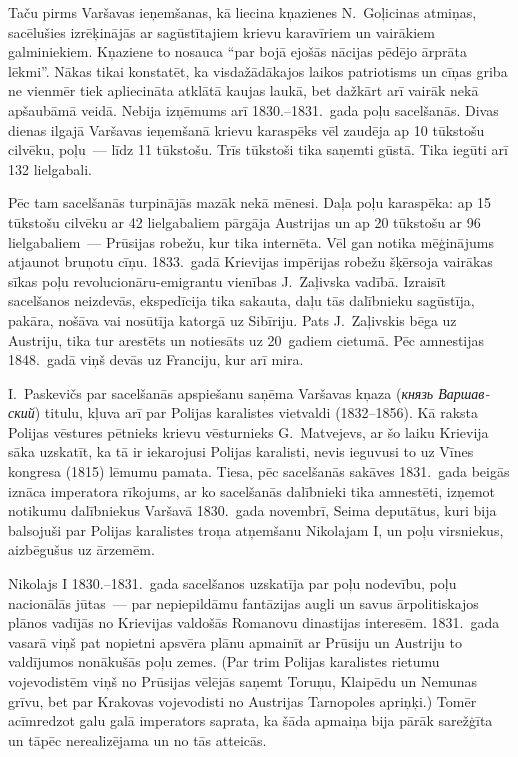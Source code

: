 \documentclass[twoside,a5paper,12pt,fleqn,openany]{extbook}
\newcommand{\rutxti}[1]{\textit{\textrussian{#1}}}
\begin{document}
\vspace{1.5em}



Taču pirms Varšavas ieņemšanas, kā liecina kņazienes N.~Goļicinas atmiņas, sacēlušies izrēķinājās ar sagūstītajiem krievu karavīriem un vairākiem galminiekiem. Kņaziene to nosauca ``par bojā ejošās nācijas pēdējo ārprāta lēkmi''. Nākas tikai konstatēt, ka visdažādākajos laikos patriotisms un cīņas griba ne vienmēr tiek apliecināta atklātā kaujas laukā, bet dažkārt arī vairāk nekā apšaubāmā veidā. Nebija izņēmums arī 1830.--1831.~gada poļu sacelšanās. Divas dienas ilgajā Varšavas ieņemšanā krievu karaspēks vēl zaudēja ap 10 tūkstošu cilvēku, poļu~--- līdz 11 tūkstošu. Trīs tūkstoši tika saņemti gūstā. Tika iegūti arī 132 lielgabali.

Pēc tam sacelšanās turpinājās mazāk nekā mēnesi. Daļa poļu karaspēka: ap 15 tūkstošu cilvēku ar 42 lielgabaliem pārgāja Austrijas un ap 20 tūkstošu ar 96 lielgabaliem~--- Prūsijas robežu, kur tika internēta. Vēl gan notika mēģinājums atjaunot bruņotu cīņu. 1833.~gadā Krievijas impērijas robežu šķērsoja vairākas sīkas poļu revolucionāru-emigrantu vienības J.~Zaļivska vadībā. Izraisīt sacelšanos neizdevās, ekspedīcija tika sakauta, daļu tās dalībnieku sagūstīja, pakāra, nošāva vai nosūtīja katorgā uz Sibīriju. Pats J.~Zaļivskis bēga uz Austriju, tika tur arestēts un notiesāts uz 20~gadiem cietumā. Pēc amnestijas 1848.~gadā viņš devās uz Franciju, kur arī mira.

I.~Paskevičs par sacelšanās apspiešanu saņēma Varšavas kņaza (\rutxti{князь Варшавский}) titulu, kļuva arī par Polijas karalistes vietvaldi (1832--1856). Kā raksta Polijas vēstures pētnieks krievu vēsturnieks G.~Matvejevs, ar šo laiku Krievija sāka uzskatīt, ka tā ir iekarojusi Polijas karalisti, nevis ieguvusi to uz Vīnes kongresa (1815) lēmumu pamata. Tiesa, pēc sacelšanās sakāves 1831.~gada beigās iznāca imperatora rīkojums, ar ko sacelšanās dalībnieki tika amnestēti, izņemot notikumu dalībniekus Varšavā 1830.~gada novembrī, Seima deputātus, kuri bija balsojuši par Polijas karalistes troņa atņemšanu Nikolajam I, un poļu virsniekus, aizbēgušus uz ārzemēm.

Nikolajs I 1830.--1831.~gada sacelšanos uzskatīja par poļu nodevību, poļu nacionālās jūtas~--- par nepiepildāmu fantāzijas augli un savus ārpolitiskajos plānos vadījās no Krievijas valdošās Romanovu dinastijas interesēm. 1831.~gada vasarā viņš pat nopietni apsvēra plānu apmainīt ar Prūsiju un Austriju to valdījumos nonākušās poļu zemes. (Par trim Polijas karalistes rietumu vojevodistēm viņš no Prūsijas vēlējās saņemt Toruņu, Klaipēdu un Nemunas grīvu, bet par Krakovas vojevodisti no Austrijas Tarnopoles apriņķi.) Tomēr acīmredzot galu galā imperators saprata, ka šāda apmaiņa bija pārāk sarežģīta un tāpēc nerealizējama un no tās atteicās.
\end{document}
